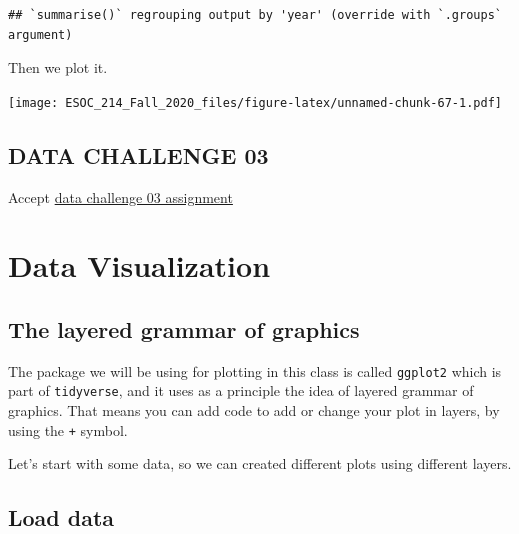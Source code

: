 \documentclass[
]{book}
\newenvironment{Shaded}{\begin{snugshade}}{\end{snugshade}}
\newcommand{\DataTypeTok}[1]{\textcolor[rgb]{0.13,0.29,0.53}{#1}}
\newcommand{\KeywordTok}[1]{\textcolor[rgb]{0.13,0.29,0.53}{\textbf{#1}}}
\newcommand{\NormalTok}[1]{#1}
\newcommand{\OperatorTok}[1]{\textcolor[rgb]{0.81,0.36,0.00}{\textbf{#1}}}
\newcommand{\StringTok}[1]{\textcolor[rgb]{0.31,0.60,0.02}{#1}}
\begin{document}
\begin{verbatim}
## `summarise()` regrouping output by 'year' (override with `.groups` argument)
\end{verbatim}

Then we plot it.

\begin{Shaded}
\end{Shaded}

\texttt{[image: ESOC\_214\_Fall\_2020\_files/figure-latex/unnamed-chunk-67-1.pdf]}

\hypertarget{data-challenge-03}{%
\section{DATA CHALLENGE 03}\label{data-challenge-03}}

Accept \href{}{data challenge 03 assignment}

\hypertarget{data-visualization}{%
\chapter{Data Visualization}\label{data-visualization}}

\hypertarget{the-layered-grammar-of-graphics}{%
\section{The layered grammar of graphics}\label{the-layered-grammar-of-graphics}}

The package we will be using for plotting in this class is called \texttt{ggplot2} which is part of \texttt{tidyverse}, and it uses as a principle the idea of layered grammar of graphics. That means you can add code to add or change your plot in layers, by using the \texttt{+} symbol.

Let's start with some data, so we can created different plots using different layers.

\hypertarget{load-data}{%
\section{Load data}\label{load-data}}
\end{document}
